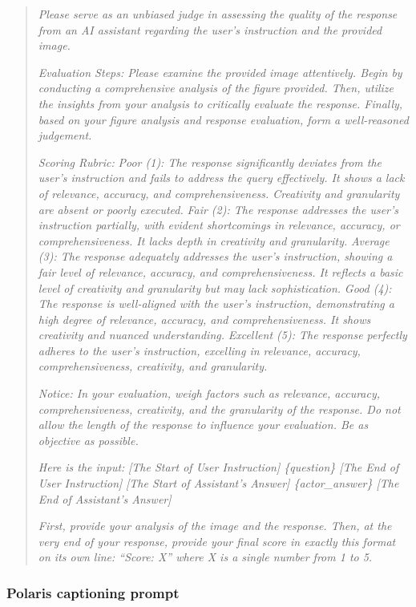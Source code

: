 \documentclass{article}
\begin{document}
\begin{quote}
\small
\textit{Please serve as an unbiased judge in assessing the quality of the response from an AI assistant regarding the user's instruction and the provided image.}

\textit{Evaluation Steps: Please examine the provided image attentively. Begin by conducting a comprehensive analysis of the figure provided. Then, utilize the insights from your analysis to critically evaluate the response. Finally, based on your figure analysis and response evaluation, form a well-reasoned judgement.}

\textit{Scoring Rubric:}
\textit{Poor (1): The response significantly deviates from the user's instruction and fails to address the query effectively. It shows a lack of relevance, accuracy, and comprehensiveness. Creativity and granularity are absent or poorly executed.}
\textit{Fair (2): The response addresses the user's instruction partially, with evident shortcomings in relevance, accuracy, or comprehensiveness. It lacks depth in creativity and granularity.}
\textit{Average (3): The response adequately addresses the user's instruction, showing a fair level of relevance, accuracy, and comprehensiveness. It reflects a basic level of creativity and granularity but may lack sophistication.}
\textit{Good (4): The response is well-aligned with the user's instruction, demonstrating a high degree of relevance, accuracy, and comprehensiveness. It shows creativity and nuanced understanding.}
\textit{Excellent (5): The response perfectly adheres to the user's instruction, excelling in relevance, accuracy, comprehensiveness, creativity, and granularity.}

\textit{Notice: In your evaluation, weigh factors such as relevance, accuracy, comprehensiveness, creativity, and the granularity of the response. Do not allow the length of the response to influence your evaluation. Be as objective as possible.}

\textit{Here is the input:}
\textit{[The Start of User Instruction] \{question\} [The End of User Instruction]}
\textit{[The Start of Assistant's Answer] \{actor\_answer\} [The End of Assistant's Answer]}

\textit{First, provide your analysis of the image and the response. Then, at the very end of your response, provide your final score in exactly this format on its own line: ``Score: X'' where X is a single number from 1 to 5.}
\end{quote}

\subsubsection{Polaris captioning prompt}
\end{document}
